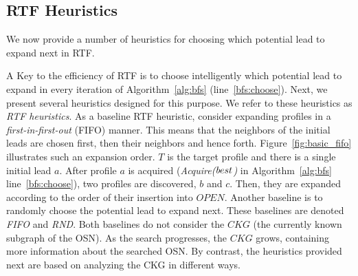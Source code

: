 \documentclass[journal]{IEEEtran}
\newcommand{\acquire}[1]{{\em Acquire(#1)}}
\newcommand{\best}{{\textit best}}
\begin{document}


\subsection{RTF Heuristics}

We now provide a number of heuristics for choosing which potential lead to expand next in RTF. 

A Key to the efficiency of RTF is to choose intelligently which potential lead to expand in every iteration of Algorithm~\ref{alg:bfs} (line~\ref{bfs:choose}). Next, we present several heuristics designed for this purpose. We refer to these heuristics as {\em RTF heuristics}. As a baseline RTF heuristic, consider expanding profiles in a {\em first-in-first-out} (FIFO) manner. This means that the neighbors of the initial leads are chosen first, then their neighbors and hence forth. 
Figure~\ref{fig:basic_fifo} illustrates such an expansion order. $T$ is the target profile and there is a single initial lead $a$. 
After profile $a$ is acquired (\acquire{$\best$} in Algorithm~\ref{alg:bfs}  line~\ref{bfs:choose}), two profiles are discovered, $b$ and $c$. Then, they are expanded according to the order of their insertion into $OPEN$.
Another baseline is to randomly choose the potential lead to expand next. 
These baselines are denoted {\em FIFO} and {\em RND}. Both baselines do not consider the $CKG$ (the currently known subgraph of the OSN). As the search progresses, the $CKG$ grows, containing more information about the searched OSN. By contrast, the heuristics provided next are based on analyzing the CKG in different ways.
 
\end{document}

